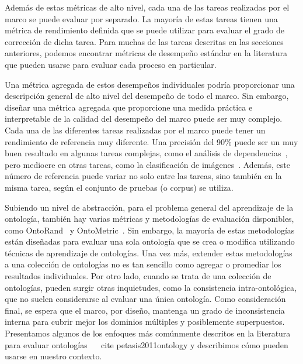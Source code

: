     Además de estas métricas de alto nivel, cada una de las tareas realizadas por el marco se puede evaluar por separado.
    La mayoría de estas tareas tienen una métrica de rendimiento definida que se puede utilizar para evaluar el grado de corrección de dicha tarea.
    Para muchas de las tareas descritas en las secciones anteriores, podemos encontrar métricas de desempeño estándar en la literatura que pueden usarse para evaluar cada proceso en particular.


    Una métrica agregada de estos desempeños individuales podría proporcionar una descripción general de alto nivel del desempeño de todo el marco.
    Sin embargo, diseñar una métrica agregada que proporcione una medida práctica e interpretable de la calidad del desempeño del marco puede ser muy complejo.
    Cada una de las diferentes tareas realizadas por el marco puede tener un rendimiento de referencia muy diferente.
    Una precisión del 90\% puede ser un muy buen resultado en algunas tareas complejas, como el análisis de dependencias~\cite{AlbertiABCGKKMO17}, pero mediocre en otras tareas, como la clasificación de imágenes~\cite{Russakovsky2015}.
    Además, este número de referencia puede variar no solo entre las tareas, sino también en la misma tarea, según el conjunto de pruebas (o corpus)
    se utiliza.

    Subiendo un nivel de abstracción, para el problema general del aprendizaje de la ontología, también hay varias métricas y metodologías de evaluación disponibles, como OntoRand~\cite{ontorand} y OntoMetric~\cite{ontometric}.
    Sin embargo, la mayoría de estas metodologías están diseñadas para evaluar una sola ontología que se crea o modifica utilizando técnicas de aprendizaje de ontologías.
    Una vez más, extender estas metodologías a una colección de ontologías no es tan sencillo como agregar o promediar los resultados individuales.
    Por otro lado, cuando se trata de una colección de ontologías, pueden surgir otras inquietudes, como la consistencia intra-ontológica, que no suelen considerarse al evaluar una única ontología.
    Como consideración final, se espera que el marco, por diseño, mantenga un grado de inconsistencia interna para cubrir mejor los dominios múltiples y posiblemente superpuestos.
    Presentamos algunos de los enfoques más comúnmente descritos en la literatura para evaluar ontologías ~ \ cite {petasis2011ontology} y describimos cómo pueden usarse en nuestro contexto.

